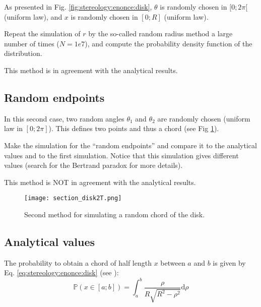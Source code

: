 As presented in Fig. \ref{fig:stereology:enonce:disk}, $\theta$ is randomly chosen in $[0;2\pi[$ (uniform law), and $x$ is randomly chosen in $[0;R]$ (uniform law). 

\begin{qbox}Repeat the simulation of $r$ by the so-called random radius method a large number of times ($N=1e7$), and compute the probability density function of the distribution.
\end{qbox}
\begin{rmq}This method is in agreement with the analytical results.
\end{rmq}

\vspace*{-6pt}


\subsection{Random endpoints}\vspace*{-2pt}
In this second case, two random angles $\theta_1$ and $\theta_2$ are randomly chosen (uniform law in $[0;2\pi]$). This defines two points and thus a chord (see Fig \ref{fig:stereology:enonce:disk2}). 

\begin{qbox}
Make the simulation for the ``random endpoints'' and compare it to the analytical values and to the first simulation. Notice that this simulation gives different values (search for the Bertrand paradox for more details).
\end{qbox}

\begin{rmq}This method is NOT in agreement with the analytical results.
\end{rmq}

\vspace*{-10pt}

\begin{figure}[H]
 \centering\caption{Second method for simulating a random chord of the disk.}%
 \texttt{[image: section\_disk2T.png]}%
 \label{fig:stereology:enonce:disk2}%
\end{figure}


\subsection{Analytical values}
The probability to obtain a chord of half length $x$ between $a$ and $b$ is given by Eq. \ref{eq:stereology:enonce:disk} (see \cite{Mazzolo2004}):
\begin{equation}
\mathbb{P}(x\in[a;b])=\int_{a}^{b}\frac{\rho}{R\sqrt{R^2-{\rho}^2}}\textrm{d}\rho \label{eq:stereology:enonce:disk}
\end{equation}


